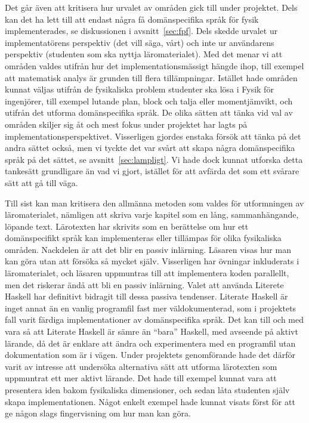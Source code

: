 Det går även att kritisera hur urvalet av områden gick till under projektet.
Dels kan det ha lett till att endast några få domänspecifika språk för fysik 
implementerades, se diskussionen i avsnitt~\ref{sec:fpf}. Dels skedde urvalet ur
implementatörens perspektiv (det vill säga, vårt) och inte ur användarens
perspektiv (studenten som ska nyttja läromaterialet). Med det menar vi att
områden valdes utifrån hur det implementationsmässigt hängde ihop, till exempel
att matematisk analys är grunden till flera tillämpningar. Istället hade områden
kunnat väljas utifrån de fysikaliska problem studenter ska lösa i Fysik för
ingenjörer, till exempel lutande plan, block och talja eller momentjämvikt, och
utifrån det utforma domänspecifika språk. De olika sätten att tänka vid val av
områden skiljer sig åt och mest fokus under projektet har lagts på
implementationsperspektivet. Visserligen gjordes enstaka försök att tänka på det
andra sättet också, men vi tyckte det var svårt att skapa några domänspecifika
språk på det sättet, se avsnitt~\ref{sec:lampligt}. Vi hade dock kunnat utforska
detta tankesätt grundligare än vad vi gjort, istället för att avfärda det som
ett svårare sätt att gå till väga.

Till sist kan man kritisera den allmänna metoden som valdes för utformningen av
läromaterialet, nämligen att skriva varje kapitel som en lång, sammanhängande,
löpande text. Lärotexten har skrivits som en berättelse om hur ett
domänspecifikt språk kan implementeras eller tillämpas för olika fysikaliska
områden. Nackdelen är att det blir en passiv inlärning. Läsaren visas hur man
kan göra utan att försöka så mycket själv. Visserligen har övningar inkluderats
i läromaterialet, och läsaren uppmuntras till att implementera koden parallellt, men det
riskerar ändå att bli en passiv inlärning. Valet att använda Literete
Haskell har definitivt bidragit till dessa passiva tendenser. Literate Haskell är
inget annat än en vanlig programfil fast mer väldokumenterad, som i projektets fall varit färdiga implementationer av domänspecifika språk. Det kan till och med vara så att Literate
Haskell är sämre än ``bara'' Haskell, med avseende på aktivt lärande, då det är
enklare att ändra och experimentera med en programfil utan dokumentation som är i vägen. Under
projektets genomförande hade det därför varit av intresse att undersöka
alternativa sätt att utforma lärotexten som uppmuntrat ett mer aktivt lärande.
Det hade till exempel kunnat vara att presentera iden bakom fysikaliska
dimensioner, och sedan låta studenten själv skapa implementationen. Något enkelt
exempel hade kunnat visats först för att ge någon slags fingervisning om hur man
kan göra.

